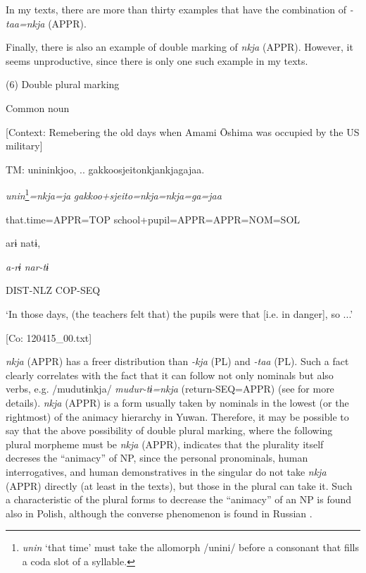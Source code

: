 In my texts, there are more than thirty examples that have the combination of \textit{{}-taa=nkja} (APPR).

Finally, there is also an example of double marking of \textit{nkja} (APPR). However, it seems unproductive, since there is only one such example in my texts.

(6)  Double plural marking

  Common noun

  [Context: Remebering the old days when Amami Ōshima was occupied by the US military]

  TM:  unininkjoo, ..\textsubscript{} {\textbar}gakkoosjeito{\textbar}nkjankjagajaa.

    \textit{unin}\footnote{\textit{unin} ‘that time’ must take the allomorph /unini/ before a consonant that fills a coda slot of a syllable.}\textit{=nkja=ja}  \textit{gakkoo+sjeito=nkja=nkja=ga=jaa}

    that.time=APPR=TOP  school+pupil=APPR=APPR=NOM=SOL

    arɨ  natɨ,

    \textit{a-rɨ}  \textit{nar-tɨ}

    DIST-NLZ  COP-SEQ

    ‘In those days, (the teachers felt that) the pupils were that [i.e. in danger], so ...’

    [Co: 120415\_00.txt]

\textit{nkja} (APPR) has a freer distribution than \textit{{}-kja} (PL) and \textit{{}-taa} (PL). Such a fact clearly correlates with the fact that it can follow not only nominals but also verbs, e.g. /mudutɨnkja/ \textit{mudur-tɨ=nkja} (return-SEQ=APPR) (see for more details). \textit{nkja} (APPR) is a form usually taken by nominals in the lowest (or the rightmost) of the animacy hierarchy in Yuwan. Therefore, it may be possible to say that the above possibility of double plural marking, where the following plural morpheme must be \textit{nkja} (APPR), indicates that the plurality itself decreses the “animacy” of NP, since the personal pronominals, human interrogatives, and human demonstratives in the singular do not take \textit{nkja} (APPR) directly (at least in the texts), but those in the plural can take it. Such a characteristic of the plural forms to decrease the “animacy” of an NP is found also in Polish, although the converse phenomenon is found in Russian \citep[188]{Comrie1989}.

